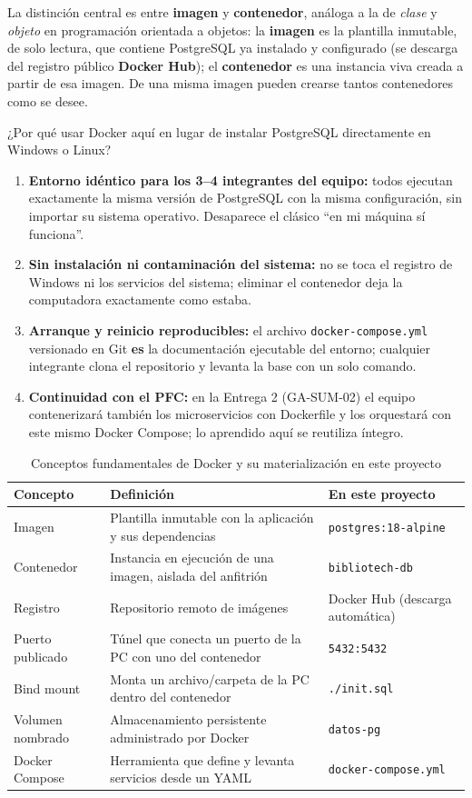 \documentclass[11pt,a4paper]{article}
\begin{document}
La distinción central es entre \textbf{imagen} y \textbf{contenedor}, análoga a la de \textit{clase} y \textit{objeto} en programación orientada a objetos: la \textbf{imagen} es la plantilla inmutable, de solo lectura, que contiene PostgreSQL ya instalado y configurado (se descarga del registro público \textbf{Docker Hub}); el \textbf{contenedor} es una instancia viva creada a partir de esa imagen. De una misma imagen pueden crearse tantos contenedores como se desee.

¿Por qué usar Docker aquí en lugar de instalar PostgreSQL directamente en Windows o Linux?

\begin{enumerate}
  \item \textbf{Entorno idéntico para los 3--4 integrantes del equipo:} todos ejecutan exactamente la misma versión de PostgreSQL con la misma configuración, sin importar su sistema operativo. Desaparece el clásico ``en mi máquina sí funciona''.
  \item \textbf{Sin instalación ni contaminación del sistema:} no se toca el registro de Windows ni los servicios del sistema; eliminar el contenedor deja la computadora exactamente como estaba.
  \item \textbf{Arranque y reinicio reproducibles:} el archivo \texttt{docker-compose.yml} versionado en Git \textbf{es} la documentación ejecutable del entorno; cualquier integrante clona el repositorio y levanta la base con un solo comando.
  \item \textbf{Continuidad con el PFC:} en la Entrega 2 (GA-SUM-02) el equipo contenerizará también los microservicios con Dockerfile y los orquestará con este mismo Docker Compose; lo aprendido aquí se reutiliza íntegro.
\end{enumerate}

\begin{table}[h!]
\centering
\caption{Conceptos fundamentales de Docker y su materialización en este proyecto}
\small
\begin{tabular}{l p{6.4cm} p{5.2cm}}
\toprule
\textbf{Concepto} & \textbf{Definición} & \textbf{En este proyecto} \\
\midrule
Imagen & Plantilla inmutable con la aplicación y sus dependencias & \texttt{postgres:18-alpine} \\
Contenedor & Instancia en ejecución de una imagen, aislada del anfitrión & \texttt{bibliotech-db} \\
Registro & Repositorio remoto de imágenes & Docker Hub (descarga automática) \\
Puerto publicado & Túnel que conecta un puerto de la PC con uno del contenedor & \texttt{5432:5432} \\
Bind mount & Monta un archivo/carpeta de la PC dentro del contenedor & \texttt{./init.sql} \\
Volumen nombrado & Almacenamiento persistente administrado por Docker & \texttt{datos-pg} \\
Docker Compose & Herramienta que define y levanta servicios desde un YAML & \texttt{docker-compose.yml} \\
\bottomrule
\end{tabular}
\end{table}
\end{document}
